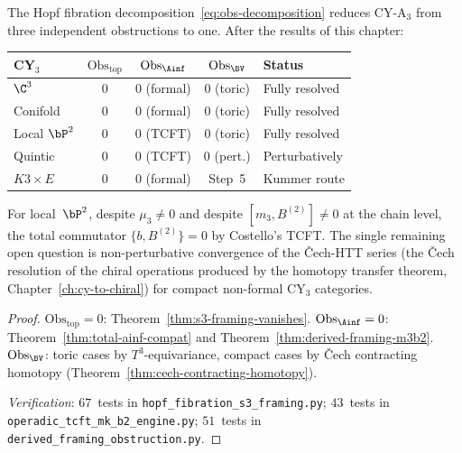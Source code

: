 \begin{proposition}
\label{prop:obs-landscape}
\ClaimStatusProvedHere{}
The Hopf fibration decomposition~\eqref{eq:obs-decomposition}
reduces CY-A$_3$ from three independent obstructions to one.
After the results of this chapter:
\begin{center}
\renewcommand{\arraystretch}{1.2}
\small
\begin{tabular}{lcccl}
 \toprule
 \textbf{CY$_3$} & $\mathrm{Obs}_{\mathrm{top}}$ &
 $\mathrm{Obs}_{\Ainf}$ & $\mathrm{Obs}_{\BV}$ &
 \textbf{Status} \\
 \midrule
 $\C^3$ & $0$ & $0$ (formal) & $0$ (toric) & Fully resolved \\
 Conifold & $0$ & $0$ (formal) & $0$ (toric) & Fully resolved \\
 Local $\bP^2$ & $0$ & $0$ (TCFT) & $0$ (toric) & Fully resolved \\
 Quintic & $0$ & $0$ (TCFT) & $0$ (pert.) & Perturbatively \\
 $K3 \times E$ & $0$ & $0$ (formal) & Step~5 &
 Kummer route \\
 \bottomrule
\end{tabular}
\end{center}
For local~$\bP^2$, despite $\mu_3 \neq 0$ and despite
$[m_3, B^{(2)}] \neq 0$ at the chain level, the total commutator
$\{b, B^{(2)}\} = 0$ by Costello's TCFT.  The single remaining
open question is non-perturbative convergence of the
\v{C}ech-HTT series (the \v{C}ech resolution of the chiral
operations produced by the homotopy transfer theorem,
Chapter~\ref{ch:cy-to-chiral}) for compact non-formal CY$_3$
categories.
\end{proposition}

\begin{proof}
$\mathrm{Obs}_{\mathrm{top}} = 0$: Theorem~\ref{thm:s3-framing-vanishes}.
$\mathrm{Obs}_{\Ainf} = 0$: Theorem~\ref{thm:total-ainf-compat}
and Theorem~\ref{thm:derived-framing-m3b2}.
$\mathrm{Obs}_{\BV}$: toric cases by $T^3$-equivariance,
compact cases by \v{C}ech contracting homotopy
(Theorem~\ref{thm:cech-contracting-homotopy}).

\noindent\textit{Verification}:
$67$~tests in \texttt{hopf\_fibration\_s3\_framing.py};
$43$~tests in \texttt{operadic\_tcft\_mk\_b2\_engine.py};
$51$~tests in \texttt{derived\_framing\_obstruction.py}.
\end{proof}

